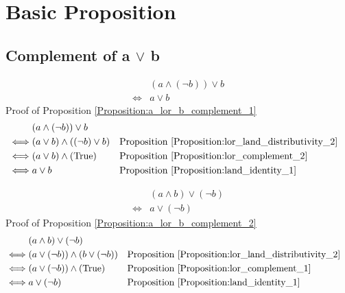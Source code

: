 \section{Basic Proposition}
\subsection{Complement of a $\lor$ b}
\begin{prop}
\label{Proposition:a_lor_b_complement_1}
\begin{align*}
& (a \land (\lnot b)) \lor b \\
\iff & a \lor b
\end{align*}
Proof of Proposition \ref{Proposition:a_lor_b_complement_1}
\begin{align*}
& (a \land (\lnot b)) \lor b \\
\iff & (a \lor b) \land ((\lnot b) \lor b)
& & \text{Proposition \ref{Proposition:lor_land_distributivity_2}} \\
\iff & (a \lor b) \land (\text{True})
& & \text{Proposition \ref{Proposition:lor_complement_2}} \\
\iff & a \lor b
& & \text{Proposition \ref{Proposition:land_identity_1}} \\
\end{align*}
\end{prop}

\begin{prop}
\label{Proposition:a_lor_b_complement_2}
\begin{align*}
& (a \land b) \lor (\lnot b) \\
\iff & a \lor (\lnot b)
\end{align*}
Proof of Proposition \ref{Proposition:a_lor_b_complement_2}
\begin{align*}
& (a \land b) \lor (\lnot b) \\
\iff & (a \lor (\lnot b)) \land (b \lor (\lnot b))
& & \text{Proposition \ref{Proposition:lor_land_distributivity_2}} \\
\iff & (a \lor (\lnot b)) \land (\text{True})
& & \text{Proposition \ref{Proposition:lor_complement_1}} \\
\iff & a \lor (\lnot b)
& & \text{Proposition \ref{Proposition:land_identity_1}} \\
\end{align*}
\end{prop}

